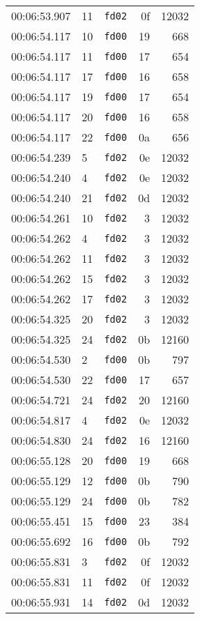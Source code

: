 \documentclass{article}
\begin{document}
\begin{longtable}{lllrr}
00:06:53.907 & 11 & \texttt{fd02} & 0f & 12032 \\
00:06:54.117 & 10 & \texttt{fd00} & 19 & 668 \\
00:06:54.117 & 11 & \texttt{fd00} & 17 & 654 \\
00:06:54.117 & 17 & \texttt{fd00} & 16 & 658 \\
00:06:54.117 & 19 & \texttt{fd00} & 17 & 654 \\
00:06:54.117 & 20 & \texttt{fd00} & 16 & 658 \\
00:06:54.117 & 22 & \texttt{fd00} & 0a & 656 \\
00:06:54.239 & 5 & \texttt{fd02} & 0e & 12032 \\
00:06:54.240 & 4 & \texttt{fd02} & 0e & 12032 \\
00:06:54.240 & 21 & \texttt{fd02} & 0d & 12032 \\
00:06:54.261 & 10 & \texttt{fd02} & 3 & 12032 \\
00:06:54.262 & 4 & \texttt{fd02} & 3 & 12032 \\
00:06:54.262 & 11 & \texttt{fd02} & 3 & 12032 \\
00:06:54.262 & 15 & \texttt{fd02} & 3 & 12032 \\
00:06:54.262 & 17 & \texttt{fd02} & 3 & 12032 \\
00:06:54.325 & 20 & \texttt{fd02} & 3 & 12032 \\
00:06:54.325 & 24 & \texttt{fd02} & 0b & 12160 \\
00:06:54.530 & 2 & \texttt{fd00} & 0b & 797 \\
00:06:54.530 & 22 & \texttt{fd00} & 17 & 657 \\
00:06:54.721 & 24 & \texttt{fd02} & 20 & 12160 \\
00:06:54.817 & 4 & \texttt{fd02} & 0e & 12032 \\
00:06:54.830 & 24 & \texttt{fd02} & 16 & 12160 \\
00:06:55.128 & 20 & \texttt{fd00} & 19 & 668 \\
00:06:55.129 & 12 & \texttt{fd00} & 0b & 790 \\
00:06:55.129 & 24 & \texttt{fd00} & 0b & 782 \\
00:06:55.451 & 15 & \texttt{fd00} & 23 & 384 \\
00:06:55.692 & 16 & \texttt{fd00} & 0b & 792 \\
00:06:55.831 & 3 & \texttt{fd02} & 0f & 12032 \\
00:06:55.831 & 11 & \texttt{fd02} & 0f & 12032 \\
00:06:55.931 & 14 & \texttt{fd02} & 0d & 12032 \\

\end{longtable}
\end{document}
